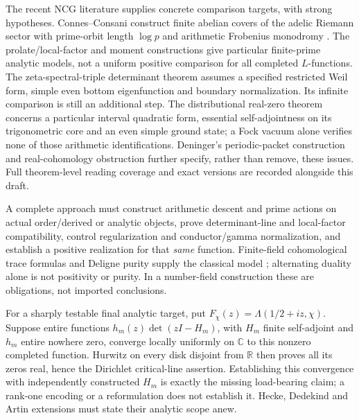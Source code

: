 \documentclass[11pt]{article}
\theoremstyle{definition}\newtheorem{definition}[theorem]{Definition}
\theoremstyle{remark}\newtheorem{remark}[theorem]{Remark}
\newcommand{\C}{\mathbb C}\newcommand{\Z}{\mathbb Z}\newcommand{\R}{\mathbb R}
\begin{document}
The recent NCG literature supplies concrete comparison targets, with strong hypotheses. Connes--Consani construct finite abelian covers of the adelic Riemann sector with prime-orbit length $\log p$ and arithmetic Frobenius monodromy \cite[Theorem3.12]{ConnesConsaniKnots}. The prolate/local-factor and moment constructions \cite{Prolate,LocalMoments} give particular finite-prime analytic models, not a uniform positive comparison for all completed $L$-functions. The zeta-spectral-triple determinant theorem \cite[Theorem5.10]{ZetaTriples} assumes a specified restricted Weil form, simple even bottom eigenfunction and boundary normalization. Its infinite comparison is still an additional step. The distributional real-zero theorem \cite[Theorem6.1]{QuadraticForms} concerns a particular interval quadratic form, essential self-adjointness on its trigonometric core and an even simple ground state; a Fock vacuum alone verifies none of those arithmetic identifications. Deninger's periodic-packet construction and real-cohomology obstruction \cite{DeningerPackets,DeningerReal} further specify, rather than remove, these issues. Full theorem-level reading coverage and exact versions are recorded alongside this draft.

A complete approach must construct arithmetic descent and prime actions on actual order/derived or analytic objects, prove determinant-line and local-factor compatibility, control regularization and conductor/gamma normalization, and establish a positive realization for that \emph{same} function. Finite-field cohomological trace formulas and Deligne purity supply the classical model \cite{DeligneWeilI,DeligneWeilII}; alternating duality alone is not positivity or purity. In a number-field construction these are obligations, not imported conclusions.

For a sharply testable final analytic target, put $F_\chi(z)=\Lambda(1/2+iz,\chi)$. Suppose entire functions $h_m(z)\det(zI-H_m)$, with $H_m$ finite self-adjoint and $h_m$ entire nowhere zero, converge locally uniformly on $\C$ to this nonzero completed function. Hurwitz on every disk disjoint from $\R$ then proves all its zeros real, hence the Dirichlet critical-line assertion. Establishing this convergence with independently constructed $H_m$ is exactly the missing load-bearing claim; a rank-one encoding or a reformulation does not establish it. Hecke, Dedekind and Artin extensions must state their analytic scope anew.
\end{document}
